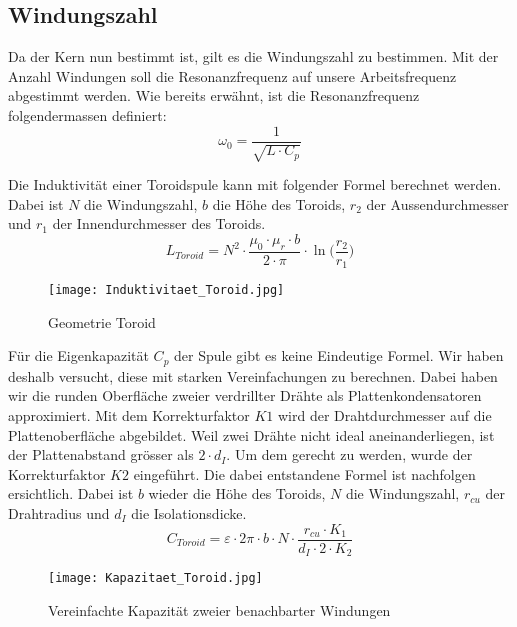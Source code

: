 \subsection{Windungszahl}
Da der Kern nun bestimmt ist, gilt es die Windungszahl zu bestimmen. Mit der Anzahl Windungen soll die Resonanzfrequenz auf unsere Arbeitsfrequenz abgestimmt werden. Wie bereits erwähnt, ist die Resonanzfrequenz folgendermassen definiert:
\begin{equation}
\omega_{0} = \frac{1}{\sqrt{L \cdot C_{p}}}
\label{equ:Resonanzfrequenz2}
\end{equation}

Die Induktivität einer Toroidspule kann mit folgender Formel berechnet werden. Dabei ist $N$ die Windungszahl, $b$ die Höhe des Toroids, $r_{2}$ der Aussendurchmesser und $r_{1}$ der Innendurchmesser des Toroids.
\begin{equation}
L_{Toroid} = N^{2}\cdot \frac{\mu_{0}\cdot \mu_{r}\cdot b}{2\cdot \pi}\cdot \ln \Big(\frac{r_{2}}{r_{1}}\Big)
\label{equ:L_Toroid}
\end{equation}

\begin{figure}[H]
	\centering
	\texttt{[image: Induktivitaet\_Toroid.jpg]}
	\caption{Geometrie Toroid}\label{fig:ind_toroid}
\end{figure}

Für die Eigenkapazität $C_{p}$ der Spule gibt es keine Eindeutige Formel. Wir haben deshalb versucht, diese mit starken Vereinfachungen zu berechnen. Dabei haben wir die runden Oberfläche zweier verdrillter Drähte als Plattenkondensatoren approximiert. Mit dem Korrekturfaktor $K1$ wird der Drahtdurchmesser auf die Plattenoberfläche abgebildet. Weil zwei Drähte nicht ideal aneinanderliegen, ist der Plattenabstand grösser als $2\cdot d_{I}$. Um dem gerecht zu werden, wurde der Korrekturfaktor $K2$ eingeführt. Die dabei entstandene Formel ist nachfolgen ersichtlich. Dabei ist $b$ wieder die Höhe des Toroids, $N$ die Windungszahl, $r_{cu}$ der Drahtradius und $d_{I}$ die Isolationsdicke.
\vspace{1cm}
\begin{equation}
C_{Toroid} = \varepsilon\cdot 2\pi\cdot b\cdot N\cdot \frac{r_{cu}\cdot K_{1}}{d_{I}\cdot 2\cdot K_{2}}
\label{equ:C_Toroid}
\end{equation}


\begin{figure}[H]
	\centering
	\texttt{[image: Kapazitaet\_Toroid.jpg]}
	\caption{Vereinfachte Kapazität zweier benachbarter Windungen}\label{fig:cap_toroid}
\end{figure}

